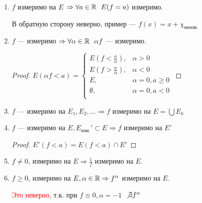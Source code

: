 \begin{prop}\itemfix
    \begin{enumerate}
        \item \(f\) измеримо на \(E\) \( \Rightarrow \forall a\in\mathbb{R} \ \ E(f = a)\) измеримо.

              В обратную сторону неверно, пример --- \(f(x) = x + \chi_\text{неизм.}\)

        \item \(f\) --- измеримо \( \Rightarrow \forall \alpha\in\R \ \ \alpha f\) --- измеримо.

              \begin{proof}
                  \(E(\alpha f < a) = \begin{cases}
                      E(f < \frac{a}{\alpha}), & \alpha > 0           \\
                      E(f > \frac{a}{\alpha}), & \alpha < 0           \\
                      E,                       & \alpha = 0, a \geq 0 \\
                      \emptyset,               & \alpha = 0, a < 0    \\
                  \end{cases}\)
              \end{proof}
        \item \(f\) --- измеримо на \(E_1, E_2, \dots \Rightarrow f\) измеримо на \(E = \bigcup E_k\)
        \item \(f\) --- измеримо на \(E, E_{\text{изм.}}'\subset E \Rightarrow f\) измеримо на \(E'\)
              \begin{proof}
                  \(E'(f < a) = E(f < a)\cap E'\)
              \end{proof}
        \item \(f \neq 0\), измеримо на \(E \Rightarrow \frac{1}{f}\) измеримо на \(E\).
        \item \(f \geq 0\), измеримо на \(E, \alpha\in\mathbb{R} \Rightarrow f^\alpha\) измеримо на \(E\).

              \textcolor{red}{Это неверно}, т.к. при \(f \equiv 0, \alpha = - 1\) \(\ \not\exists f^\alpha\)
    \end{enumerate}
\end{prop}

